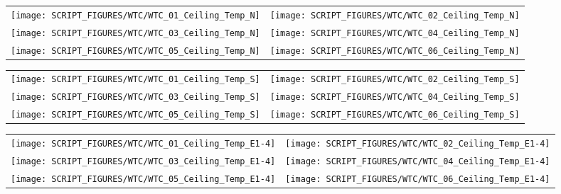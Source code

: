\newpage

\begin{figure}[p]
\begin{tabular*}{\textwidth}{l@{\extracolsep{\fill}}r}
\texttt{[image: SCRIPT\_FIGURES/WTC/WTC\_01\_Ceiling\_Temp\_N]} &
\texttt{[image: SCRIPT\_FIGURES/WTC/WTC\_02\_Ceiling\_Temp\_N]} \\
\texttt{[image: SCRIPT\_FIGURES/WTC/WTC\_03\_Ceiling\_Temp\_N]} &
\texttt{[image: SCRIPT\_FIGURES/WTC/WTC\_04\_Ceiling\_Temp\_N]} \\
\texttt{[image: SCRIPT\_FIGURES/WTC/WTC\_05\_Ceiling\_Temp\_N]} &
\texttt{[image: SCRIPT\_FIGURES/WTC/WTC\_06\_Ceiling\_Temp\_N]}
\end{tabular*}
\label{NIST_WTC_Ceiling_N}
\end{figure}

\begin{figure}[p]
\begin{tabular*}{\textwidth}{l@{\extracolsep{\fill}}r}
\texttt{[image: SCRIPT\_FIGURES/WTC/WTC\_01\_Ceiling\_Temp\_S]} &
\texttt{[image: SCRIPT\_FIGURES/WTC/WTC\_02\_Ceiling\_Temp\_S]} \\
\texttt{[image: SCRIPT\_FIGURES/WTC/WTC\_03\_Ceiling\_Temp\_S]} &
\texttt{[image: SCRIPT\_FIGURES/WTC/WTC\_04\_Ceiling\_Temp\_S]} \\
\texttt{[image: SCRIPT\_FIGURES/WTC/WTC\_05\_Ceiling\_Temp\_S]} &
\texttt{[image: SCRIPT\_FIGURES/WTC/WTC\_06\_Ceiling\_Temp\_S]}
\end{tabular*}
\label{NIST_WTC_Ceiling_S}
\end{figure}

\begin{figure}[p]
\begin{tabular*}{\textwidth}{l@{\extracolsep{\fill}}r}
\texttt{[image: SCRIPT\_FIGURES/WTC/WTC\_01\_Ceiling\_Temp\_E1-4]} &
\texttt{[image: SCRIPT\_FIGURES/WTC/WTC\_02\_Ceiling\_Temp\_E1-4]} \\
\texttt{[image: SCRIPT\_FIGURES/WTC/WTC\_03\_Ceiling\_Temp\_E1-4]} &
\texttt{[image: SCRIPT\_FIGURES/WTC/WTC\_04\_Ceiling\_Temp\_E1-4]} \\
\texttt{[image: SCRIPT\_FIGURES/WTC/WTC\_05\_Ceiling\_Temp\_E1-4]} &
\texttt{[image: SCRIPT\_FIGURES/WTC/WTC\_06\_Ceiling\_Temp\_E1-4]}
\end{tabular*}
\label{NIST_WTC_Ceiling_E1-4}
\end{figure}

